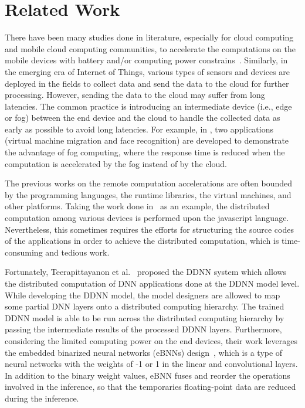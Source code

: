 \documentclass[conference]{IEEEtran}
\begin{document}
\section{Related Work}
\label{sec:relatedwork}
There have been many studies done in literature, especially for cloud computing and mobile cloud computing communities, to accelerate the computations on the mobile devices with battery and/or computing power constrains~\cite{xiao2012vocl,Tu14,fernando2013mobile,Hung14,HungTWS15,yi2015fog,Tseng15,Silla14}. Similarly, in the emerging era of Internet of Things,  various types of sensors and devices are deployed in the fields to collect data and send the data to the cloud for further processing. However, sending the data to the cloud may suffer from long latencies. The common practice is introducing an intermediate device (i.e., edge or fog) between the end device and the cloud to handle the collected data as early as possible to avoid long latencies. For example, in \cite{yi2015fog}, two applications (virtual machine migration and face recognition) are developed to demonstrate the advantage of fog computing, where the response time is reduced when the computation is accelerated by the fog instead of by the cloud.

The previous works on the remote computation accelerations are often bounded by the programming languages, the runtime libraries, the virtual machines, and other platforms. Taking the work done in~\cite{Tseng15} as an example, the distributed computation among various devices is performed upon the javascript language. Nevertheless, this sometimes requires the efforts for structuring the source codes of the applications in order to achieve the distributed computation, which is time-consuming and tedious work.

Fortunately, Teerapittayanon et al.​​~\cite{Teerapittayanon17} proposed the DDNN system which allows the distributed computation of DNN applications done at the DDNN model level. While developing the DDNN model, the model designers are allowed to map some partial DNN layers onto a distributed computing hierarchy. The trained DDNN model is able to be run across the distributed computing hierarchy by passing the intermediate results of the processed DDNN layers.
Furthermore, considering the limited computing power on the end devices, their work leverages the embedded binarized neural networks (eBNNs) design~\cite{McDanel17}, which is a type of neural networks with the weights of -1 or 1 in the linear and convolutional layers. In addition to the binary weight values, eBNN fuses and reorder the operations involved in the inference, so that the temporaries floating-point data are reduced during the inference.
\end{document}
